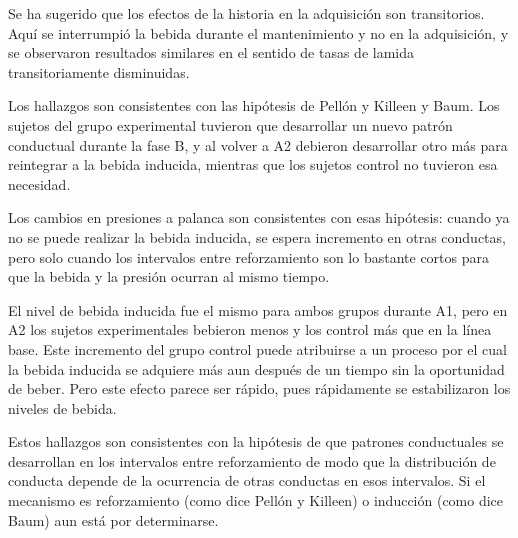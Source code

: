 \documentclass[a4paper,12pt]{article}
\begin{document}
Se ha sugerido que los efectos de la historia en la adquisición son transitorios. Aquí se interrumpió la bebida durante el mantenimiento y no en la adquisición, y se observaron resultados similares en el sentido de tasas de lamida transitoriamente disminuidas.

Los hallazgos son consistentes con las hipótesis de Pellón y Killeen y Baum. Los sujetos del grupo experimental tuvieron que desarrollar un nuevo patrón conductual durante la fase B, y al volver a A2 debieron desarrollar otro más para reintegrar a la bebida inducida, mientras que los sujetos control no tuvieron esa necesidad.

Los cambios en presiones a palanca son consistentes con esas hipótesis: cuando ya no se puede realizar la bebida inducida, se espera incremento en otras conductas, pero solo cuando los intervalos entre reforzamiento son lo bastante cortos para que la bebida y la presión ocurran al mismo tiempo.

El nivel de bebida inducida fue el mismo para ambos grupos durante A1, pero en A2 los sujetos experimentales bebieron menos y los control más que en la línea base. Este incremento del grupo control puede atribuirse a un proceso por el cual la bebida inducida se adquiere más aun después de un tiempo sin la oportunidad de beber. Pero este efecto parece ser rápido, pues rápidamente se estabilizaron los niveles de bebida.

Estos hallazgos son consistentes con la hipótesis de que patrones conductuales se desarrollan en los intervalos entre reforzamiento de modo que la distribución de conducta depende de la ocurrencia de otras conductas en esos intervalos. Si el mecanismo es reforzamiento (como dice Pellón y Killeen) o inducción (como dice Baum) aun está por determinarse.
\end{document}
